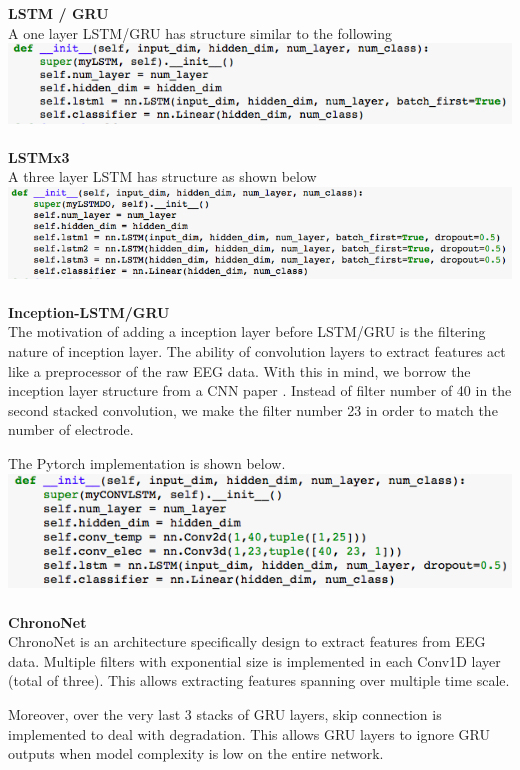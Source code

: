 \documentclass[10pt,twocolumn,letterpaper]{article}
\begin{document}
\textbf{LSTM / GRU} \\
A one layer LSTM/GRU has structure similar to the following \\
\includegraphics[scale=0.4]{stru_LSTM} \\ \\
\textbf{LSTMx3} \\
A three layer LSTM has structure as shown below \\
\includegraphics[scale=0.35]{stru_LSTMDO} \\ \\
\textbf{Inception-LSTM/GRU} \\
The motivation of adding a inception layer before LSTM/GRU is the filtering nature of inception layer. The ability of convolution layers to extract features act like a preprocessor of the raw EEG data. With this in mind, we borrow the inception layer structure from a CNN paper \cite{CNN}. Instead of filter number of 40 in the second stacked convolution, we make the filter number 23 in order to match the number of electrode. \par
The Pytorch implementation is shown below. \\
\includegraphics[scale=0.45]{stru_CONVLSTM} \\ \\
\textbf{ChronoNet} \\
ChronoNet is an architecture specifically design to extract features from EEG data. Multiple filters with exponential size is implemented in each Conv1D layer (total of three). This allows extracting features spanning over multiple time scale. \par
Moreover, over the very last 3 stacks of GRU layers, skip connection is implemented to deal with degradation. This allows GRU layers to ignore GRU outputs when model complexity is low on the entire network. \cite{ChronoNet} \\
\end{document}
